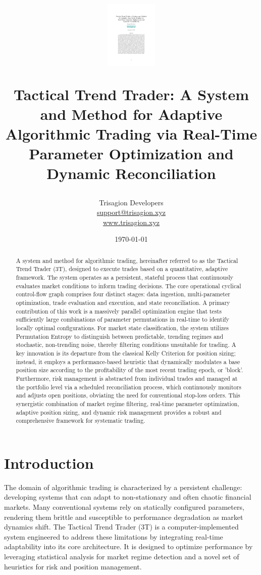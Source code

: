 \documentclass[10pt]{article}
\title{%
\includegraphics[width=2.5cm]{TTT.pdf}

\textbf{Tactical Trend Trader: A System and Method for Adaptive Algorithmic Trading via Real-Time Parameter Optimization and Dynamic Reconciliation}}
\author{Trisagion Developers \\
        \href{mailto:support@trisagion.xyz}{support@trisagion.xyz} \\
        \url{www.trisagion.xyz}}
\date{\today}
\begin{document}
\maketitle


\begin{abstract}
    A system and method for algorithmic trading, hereinafter referred to as the Tactical Trend Trader (3T), designed to execute trades based on a quantitative, adaptive framework. The system operates as a persistent, stateful process that continuously evaluates market conditions to inform trading decisions. The core operational cyclical control-flow graph comprises four distinct stages: data ingestion, multi-parameter optimization, trade evaluation and execution, and state reconciliation. A primary contribution of this work is a massively parallel optimization engine that tests sufficiently large combinations of parameter permutations in real-time to identify locally optimal configurations. For market state classification, the system utilizes Permutation Entropy to distinguish between predictable, trending regimes and stochastic, non-trending noise, thereby filtering conditions unsuitable for trading. A key innovation is its departure from the classical Kelly Criterion for position sizing; instead, it employs a performance-based heuristic that dynamically modulates a base position size according to the profitability of the most recent trading epoch, or 'block'. Furthermore, risk management is abstracted from individual trades and managed at the portfolio level via a scheduled reconciliation process, which continuously monitors and adjusts open positions, obviating the need for conventional stop-loss orders. This synergistic combination of market regime filtering, real-time parameter optimization, adaptive position sizing, and dynamic risk management provides a robust and comprehensive framework for systematic trading.
\end{abstract}

\section{Introduction}
The domain of algorithmic trading is characterized by a persistent challenge: developing systems that can adapt to non-stationary and often chaotic financial markets. Many conventional systems rely on statically configured parameters, rendering them brittle and susceptible to performance degradation as market dynamics shift. The Tactical Trend Trader (3T) is a computer-implemented system engineered to address these limitations by integrating real-time adaptability into its core architecture. It is designed to optimize performance by leveraging statistical analysis for market regime detection and a novel set of heuristics for risk and position management.
\end{document}
